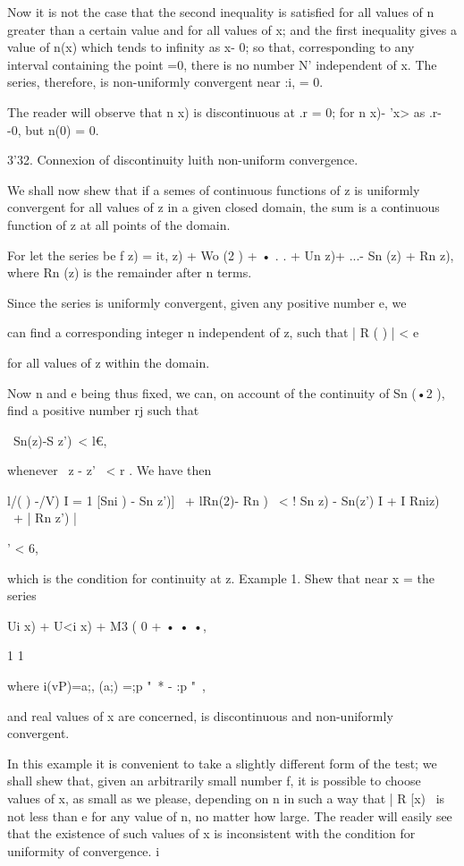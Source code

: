 %
%

Now it is not the case that the second inequality is satisfied for all
values of n greater than a certain value and for all values of x; and
the first inequality gives a value of n(x) which tends to infinity as
x- 0; so that, corresponding to any interval containing the point =0,
there is no number N' independent of x. The series, therefore, is
non-uniformly convergent near :i, = 0.

The reader will observe that n x) is discontinuous at .r = 0; for n
x)- 'x> as .r- -0, but n(0) = 0.

3'32. Connexion of discontinuity luith non-uniform convergence.

We shall now shew that if a semes of continuous functions of z is
uniformly convergent for all values of z in a given closed domain, the
sum is a continuous function of z at all points of the domain.

For let the series be f z) = it, z) + Wo (2 ) + • . . + Un z)+ ...- Sn
(z) + Rn z), where Rn (z) is the remainder after n terms.

Since the series is uniformly convergent, given any positive number e,
we

can find a corresponding integer n independent of z, such that | R ( )
| < e

for all values of z within the domain.

Now n and e being thus fixed, we can, on account of the continuity of
Sn (•2 ), find a positive number rj such that

\ Sn(z)-S z')\ < l€,

whenever \ z - z' \ < r . We have then

l/( ) -/V) I = 1 [Sni ) - Sn z')] \ + lRn(2)- Rn ) \ < ! Sn z) -
Sn(z') I + I Rniz) \ + | Rn z') |

' < 6,

which is the condition for continuity at z. Example 1. Shew that near
x = the series

Ui x) + U<i x) + M3 ( 0 + • • •,

1 1

where i(vP)=a;, (a;) =;p "~* - :p "~,

and real values of x are concerned, is discontinuous and non-uniformly
convergent.

In this example it is convenient to take a slightly different form of
the test; we shall shew that, given an arbitrarily small number f, it
is possible to choose values of x, as small as we please, depending on
n in such a way that | R [x) \ is not less than e for any value of n,
no matter how large. The reader will easily see that the existence of
such values of x is inconsistent with the condition for uniformity of
convergence. i\

